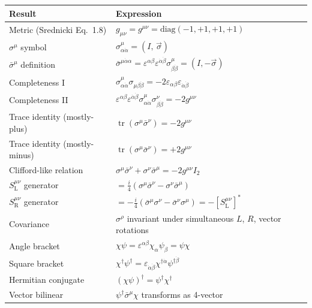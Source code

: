 \documentclass[12pt]{article}
\begin{document}
\begin{center}
\renewcommand{\arraystretch}{1.5}
\begin{tabular}{@{}p{5.5cm}p{8cm}@{}}
  \toprule
  Result & Expression \\
  \midrule
  Metric (Srednicki Eq.~1.8) & $g_{\mu\nu} = g^{\mu\nu} = \mathrm{diag}(-1,+1,+1,+1)$ \\[2pt]
  $\sigma^\mu$ symbol & $\sigma^\mu_{\alpha\dot\alpha} = (I,\,\vec\sigma)$ \\[2pt]
  $\bar\sigma^\mu$ definition & $\bar\sigma^{\mu\dot\alpha\alpha}
    = \varepsilon^{\alpha\beta}\varepsilon^{\dot\alpha\dot\beta}\sigma^\mu_{\beta\dot\beta}
    = (I,-\vec\sigma)$ \quad [35.19] \\[2pt]
  Completeness I \quad [35.4] &
    $\sigma^\mu_{\alpha\dot\alpha}\sigma_{\mu\beta\dot\beta}
     = -2\varepsilon_{\alpha\beta}\varepsilon_{\dot\alpha\dot\beta}$ \\[2pt]
  Completeness II \quad [35.5] &
    $\varepsilon^{\alpha\beta}\varepsilon^{\dot\alpha\dot\beta}
     \sigma^\mu_{\alpha\dot\alpha}\sigma^\nu_{\beta\dot\beta} = -2g^{\mu\nu}$ \\[2pt]
  Trace identity (mostly-plus) &
    $\operatorname{tr}(\sigma^\mu\bar\sigma^\nu) = -2g^{\mu\nu}$ \\[2pt]
  Trace identity (mostly-minus) &
    $\operatorname{tr}(\sigma^\mu\bar\sigma^\nu) = +2g^{\mu\nu}$  \\[2pt]
  Clifford-like relation &
    $\sigma^\mu\bar\sigma^\nu + \sigma^\nu\bar\sigma^\mu = -2g^{\mu\nu}I_2$ \\[2pt]
  $S^{\mu\nu}_{\mathrm{L}}$ generator \quad [35.21] &
    $= \tfrac{i}{4}(\sigma^\mu\bar\sigma^\nu - \sigma^\nu\bar\sigma^\mu)$ \\[2pt]
  $S^{\mu\nu}_{\mathrm{R}}$ generator \quad [35.22] &
    $= -\tfrac{i}{4}(\bar\sigma^\mu\sigma^\nu - \bar\sigma^\nu\sigma^\mu)
     = -[S^{\mu\nu}_{\mathrm{L}}]^*$ \\[2pt]
  Covariance \quad [35.14] &
    $\sigma^\rho$ invariant under simultaneous $L$, $R$, vector rotations \\[2pt]
  Angle bracket &
    $\chi\psi = \varepsilon^{\alpha\beta}\chi_\alpha\psi_\beta = \psi\chi$
    \quad [35.23, 35.25] \\[2pt]
  Square bracket &
    $\chi^\dagger\psi^\dagger
     = \varepsilon_{\dot\alpha\dot\beta}\chi^{\dagger\dot\alpha}\psi^{\dagger\dot\beta}$
    \quad [35.23] \\[2pt]
  Hermitian conjugate &
    $(\chi\psi)^\dagger = \psi^\dagger\chi^\dagger$ \quad [35.26] \\[2pt]
  Vector bilinear &
    $\psi^\dagger\bar\sigma^\mu\chi$ transforms as 4-vector \quad [35.28] \\[2pt]
  \bottomrule
\end{tabular}
\end{center}
\end{document}
